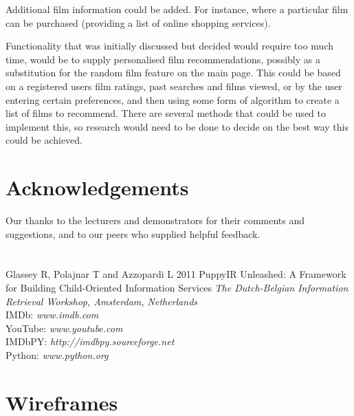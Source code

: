 \documentclass{sig-alt-release2}
\begin{document}
Additional film information could be added. For instance, where a particular film can be purchased (providing a list of online shopping services). 
 
Functionality that was initially discussed but decided would require too much time, would be to supply personalised film recommendations, possibly as a substitution for the random film feature on the main page. This could be based on a registered users film ratings, past searches and films viewed, or by the user entering certain preferences, and then using some form of algorithm to create a list of films to recommend. There are several methods that could be used to implement this, so research would need to be done to decide on the best way this could be achieved.

\section{Acknowledgements}
Our thanks to the lecturers and demonstrators for their comments and suggestions, and to our peers who supplied helpful feedback.

\newpage
\section*{}
\begin{thebibliography}{9}
 Glassey R, Polajnar T and Azzopardi L 2011 PuppyIR Unleashed: A Framework for Building Child-Oriented Information Services {\it The Dutch-Belgian Information Retrieval Workshop, Amsterdam, Netherlands}\\
 IMDb: {\it www.imdb.com}\\
 YouTube: {\it www.youtube.com}\\
 IMDbPY: {\it http://imdbpy.sourceforge.net}\\
 Python: {\it www.python.org}\\
\end{thebibliography}

%
%

\newpage
\appendix
\section{Wireframes}
\end{document}

